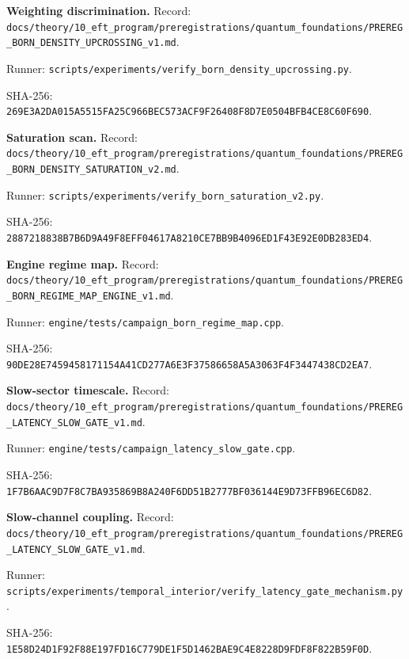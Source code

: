 \documentclass[11pt,a4paper]{article}
\newcommand{\digest}[2]{\texttt{#1}\allowbreak\texttt{#2}}
\theoremstyle{definition}
\theoremstyle{plain}
\theoremstyle{remark}
\begin{document}
{\footnotesize\raggedright
\noindent\textbf{Weighting discrimination.}\quad
Record: \nolinkurl{docs/theory/10_eft_program/preregistrations/quantum_foundations/PREREG_BORN_DENSITY_UPCROSSING_v1.md}.\par
\noindent Runner: \nolinkurl{scripts/experiments/verify_born_density_upcrossing.py}.\par
\noindent SHA-256: \digest{269E3A2DA015A5515FA25C966BEC573A}{CF9F26408F8D7E0504BFB4CE8C60F690}.\par\smallskip

\noindent\textbf{Saturation scan.}\quad
Record: \nolinkurl{docs/theory/10_eft_program/preregistrations/quantum_foundations/PREREG_BORN_DENSITY_SATURATION_v2.md}.\par
\noindent Runner: \nolinkurl{scripts/experiments/verify_born_saturation_v2.py}.\par
\noindent SHA-256: \digest{2887218838B7B6D9A49F8EFF04617A82}{10CE7BB9B4096ED1F43E92E0DB283ED4}.\par\smallskip

\noindent\textbf{Engine regime map.}\quad
Record: \nolinkurl{docs/theory/10_eft_program/preregistrations/quantum_foundations/PREREG_BORN_REGIME_MAP_ENGINE_v1.md}.\par
\noindent Runner: \nolinkurl{engine/tests/campaign_born_regime_map.cpp}.\par
\noindent SHA-256: \digest{90DE28E7459458171154A41CD277A6E3F}{37586658A5A3063F4F3447438CD2EA7}.\par\smallskip

\noindent\textbf{Slow-sector timescale.}\quad
Record: \nolinkurl{docs/theory/10_eft_program/preregistrations/quantum_foundations/PREREG_LATENCY_SLOW_GATE_v1.md}.\par
\noindent Runner: \nolinkurl{engine/tests/campaign_latency_slow_gate.cpp}.\par
\noindent SHA-256: \digest{1F7B6AAC9D7F8C7BA935869B8A240F6D}{D51B2777BF036144E9D73FFB96EC6D82}.\par\smallskip

\noindent\textbf{Slow-channel coupling.}\quad
Record: \nolinkurl{docs/theory/10_eft_program/preregistrations/quantum_foundations/PREREG_LATENCY_SLOW_GATE_v1.md}.\par
\noindent Runner: \nolinkurl{scripts/experiments/temporal_interior/verify_latency_gate_mechanism.py}.\par
\noindent SHA-256: \digest{1E58D24D1F92F88E197FD16C779DE1F5}{D1462BAE9C4E8228D9FDF8F822B59F0D}.\par
}
\end{document}
